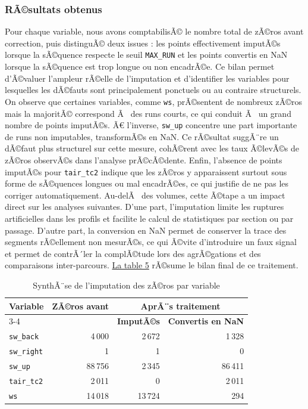 \documentclass{article}
\begin{document}
\subsubsection{RÃ©sultats obtenus}

Pour chaque variable, nous avons comptabilisÃ© le nombre total de zÃ©ros avant correction, puis distinguÃ© deux issues : les points effectivement imputÃ©s lorsque la sÃ©quence respecte le seuil \texttt{MAX\_RUN} et les points convertis en NaN lorsque la sÃ©quence est trop longue ou non encadrÃ©e. Ce bilan permet d'Ã©valuer l'ampleur rÃ©elle de l'imputation et d'identifier les variables pour lesquelles les dÃ©fauts sont principalement ponctuels ou au contraire structurels. On observe que certaines variables, comme \texttt{ws}, prÃ©sentent de nombreux zÃ©ros mais la majoritÃ© correspond Ã  des runs courts, ce qui conduit Ã  un grand nombre de points imputÃ©s. Ã€ l'inverse, \texttt{sw\_up} concentre une part importante de runs non imputables, transformÃ©s en NaN. Ce rÃ©sultat suggÃ¨re un dÃ©faut plus structurel sur cette mesure, cohÃ©rent avec les taux Ã©levÃ©s de zÃ©ros observÃ©s dans l'analyse prÃ©cÃ©dente. Enfin, l'absence de points imputÃ©s pour \texttt{tair\_tc2} indique que les zÃ©ros y apparaissent surtout sous forme de sÃ©quences longues ou mal encadrÃ©es, ce qui justifie de ne pas les corriger automatiquement. Au-delÃ  des volumes, cette Ã©tape a un impact direct sur les analyses suivantes. D'une part, l'imputation limite les ruptures artificielles dans les profils et facilite le calcul de statistiques par section ou par passage. D'autre part, la conversion en NaN permet de conserver la trace des segments rÃ©ellement non mesurÃ©s, ce qui Ã©vite d'introduire un faux signal et permet de contrÃ´ler la complÃ©tude lors des agrÃ©gations et des comparaisons inter-parcours. \hyperref[tab:imputation_summary]{La table 5} rÃ©sume le bilan final de ce traitement.

\begin{table}[H]
\centering
\renewcommand{\arraystretch}{1.15}
\setlength{\tabcolsep}{7pt}
\begin{tabular}{l r rr}
\toprule
\textbf{Variable} &
\textbf{ZÃ©ros avant} &
\multicolumn{2}{c}{\textbf{AprÃ¨s traitement}} \\
\cmidrule(lr){3-4}
& &
\textbf{ImputÃ©s} &
\textbf{Convertis en NaN} \\
\midrule
\texttt{sw\_back}  & 4\,000  & 2\,672  & 1\,328 \\
\texttt{sw\_right} & 1      & 1      & 0 \\
\texttt{sw\_up}    & 88\,756 & 2\,345  & 86\,411 \\
\texttt{tair\_tc2} & 2\,011  & 0      & 2\,011 \\
\texttt{ws}        & 14\,018 & 13\,724 & 294 \\
\bottomrule
\end{tabular}
\caption{SynthÃ¨se de l'imputation des zÃ©ros par variable}
\label{tab:imputation_summary}
\end{table}
\end{document}
